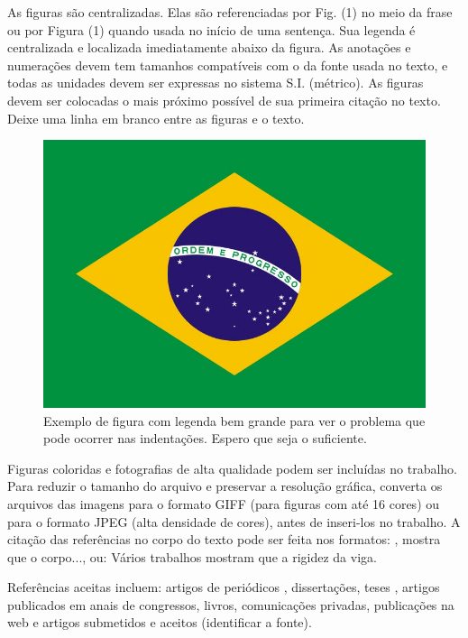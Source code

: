 \documentclass{ufscThesis}
\begin{document}
As figuras são centralizadas. Elas são referenciadas por Fig. (1) no meio da frase ou por Figura (1) quando usada no início de uma sentença. Sua legenda é centralizada e localizada imediatamente abaixo da figura. As anotações e numerações devem tem tamanhos compatíveis com o da fonte usada no texto, e todas as unidades devem ser expressas no sistema S.I. (métrico). As figuras devem ser colocadas o mais próximo possível de sua primeira citação no texto. Deixe uma linha em branco entre as figuras e o texto.

\begin{figure}[ht]
\begin{center}
\includegraphics[scale=0.6]{figuras/figura.jpg}
\caption{Exemplo de figura com legenda bem grande para ver o problema que pode ocorrer nas indentações. Espero que seja o suficiente.}
\end{center}
\end{figure}

Figuras coloridas e fotografias de alta qualidade podem ser incluídas no trabalho. Para reduzir o tamanho do arquivo e preservar a resolução gráfica, converta os arquivos das imagens para o  formato GIFF (para figuras com até 16 cores) ou para o formato JPEG (alta densidade de cores), antes de inseri-los no trabalho.
A citação das referências no corpo do texto pode ser feita nos formatos: , mostra que o corpo..., ou: Vários trabalhos  \cite{Coimbra84,Clark86,Sparrow80} mostram que a rigidez da viga.

Referências aceitas incluem: artigos de periódicos \cite{Soviero97}, dissertações, teses \cite{Lee03}, artigos publicados em anais de congressos, livros, comunicações privadas, publicações na web \cite{ABCM04,MLA04} e artigos submetidos e aceitos (identificar a fonte)\cite{Autor04}.
\end{document}
